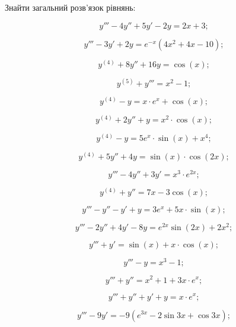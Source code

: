 Знайти загальний розв'язок рівнянь:

\begin{multicols}{2}
\begin{problem}
	\[y'''-4y''+5y'-2y=2x+3;\]
\end{problem}
\begin{problem}
	\[y'''-3y'+2y=e^{-x}(4x^2+4x-10);\]
\end{problem}
\begin{problem}
	\[y^{(4)}+8y''+16y=\cos(x);\]
\end{problem}
\begin{problem}
	\[y^{(5)}+y'''=x^2-1;\]
\end{problem}
\begin{problem}
	\[y^{(4)}-y=x\cdot e^x+\cos(x);\]
\end{problem}
\begin{problem}
	\[y^{(4)}+2y''+y=x^2\cdot\cos(x);\]
\end{problem}
\begin{problem}
	\[y^{(4)}-y=5e^x\cdot\sin(x)+x^4;\]
\end{problem}
\begin{problem}
	\[y^{(4)}+5y''+4y=\sin(x)\cdot\cos(2x);\]
\end{problem}
\begin{problem}
	\[y'''-4y''+3y'=x^3 \cdot e^{2x};\]
\end{problem}
\begin{problem}
	\[y^{(4)}+y''=7x-3\cos(x);\]
\end{problem}
\begin{problem}
	\[y'''-y''-y'+y=3e^x+5x\cdot\sin(x);\]
\end{problem}
\begin{problem}
	\[y'''-2y''+4y'-8y=e^{2x}\sin(2x)+2x^2;\]
\end{problem}
\begin{problem}
	\[y'''+y'=\sin(x)+x\cdot\cos(x);\]
\end{problem}
\begin{problem}
	\[y'''-y=x^3-1;\]
\end{problem}
\begin{problem}
	\[y'''+y''=x^2+1+3x\cdot e^x;\]
\end{problem}
\begin{problem}
	\[y'''+y''+y'+y=x\cdot e^x;\]
\end{problem}
\begin{problem}
	\[y'''-9y'=-9(e^{3x}-2\sin3x+\cos3x);\]
\end{problem}
\begin{problem}

\end{problem}
\end{multicols}
